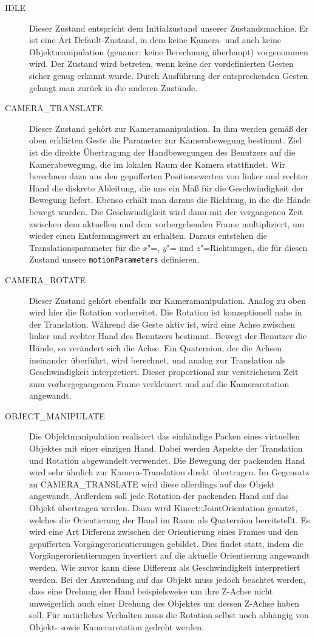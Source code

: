 	\begin{description}
		\item[IDLE] Dieser Zustand entspricht dem Initialzustand unserer Zustandsmachine. Er ist eine Art Default-Zustand, in dem keine Kamera- und auch keine Objektmanipulation (genauer: keine Berechnung überhaupt) vorgenommen wird. Der Zustand wird betreten, wenn keine der vordefinierten Gesten sicher genug erkannt wurde. Durch Ausführung der entsprechenden Gesten gelangt man zurück in die anderen Zustände.
		\item[CAMERA\_TRANSLATE] Dieser Zustand gehört zur Kameramanipulation. In ihm werden gemäß der oben erklärten Geste die Parameter zur Kamerabewegung bestimmt. Ziel ist die direkte Übertragung der Handbewegungen des Benutzers auf die Kamerabewegung, die im lokalen Raum der Kamera stattfindet. Wir berechnen dazu aus den gepufferten Positionswerten von linker und rechter Hand die diskrete Ableitung, die uns ein Maß für die Geschwindigkeit der Bewegung liefert. Ebenso erhält man daraus die Richtung, in die die Hände bewegt wurden. Die Geschwindigkeit wird dann mit der vergangenen Zeit zwischen dem aktuellen und dem vorhergehenden Frame multipliziert, um wieder einen Entfernungswert zu erhalten. Daraus entstehen die Translationsparameter für die $x$"=, $y$"= und $z$"=Richtungen, die für diesen Zustand unsere \texttt{motionParameters} definieren.
		\item[CAMERA\_ROTATE] Dieser Zustand gehört ebenfalls zur Kameramanipulation. Analog zu oben wird hier die Rotation vorbereitet. Die Rotation ist konzeptionell nahe in der Translation. Während die Geste aktiv ist, wird eine Achse zwischen linker und rechter Hand des Benutzers bestimmt. Bewegt der Benutzer die Hände, so verändert sich die Achse. Ein Quaternion, der die Achsen ineinander überführt, wird berechnet, und analog zur Translation als Geschwindigkeit interpretiert. Dieser proportional zur verstrichenen Zeit zum vorhergegangenen Frame verkleinert und auf die Kamerarotation angewandt.
		\item[OBJECT\_MANIPULATE] Die Objektmanipulation realisiert das einhändige Packen eines virtuellen Objektes mit einer einzigen Hand. Dabei werden Aspekte der Translation und Rotation abgewandelt verwendet. Die Bewegung der packenden Hand wird sehr ähnlich zur Kamera-Translation direkt übertragen. Im Gegensatz zu CAMERA\_TRANSLATE wird diese allerdings auf das Objekt angewandt. Außerdem soll jede Rotation der packenden Hand auf das Objekt übertragen werden. Dazu wird Kinect::JointOrientation genutzt, welches die Orientierung der Hand im Raum als Quaternion bereitstellt. Es wird eine Art Differenz zwischen der Orientierung eines Frames und den gepufferten Vorgängerorientierungen gebildet. Dies findet statt, indem die Vorgängerorientierungen invertiert auf die aktuelle Orientierung angewandt werden. Wie zuvor kann diese Differenz als Geschwindigkeit interpretiert werden. Bei der Anwendung auf das Objekt muss jedoch beachtet werden, dass eine Drehung der Hand beispielsweise um ihre Z-Achse nicht unweigerlich auch einer Drehung des Objektes um dessen Z-Achse haben soll. Für natürliches Verhalten muss die Rotation selbst noch abhängig von Objekt- sowie Kamerarotation gedreht werden.

\end{description}
